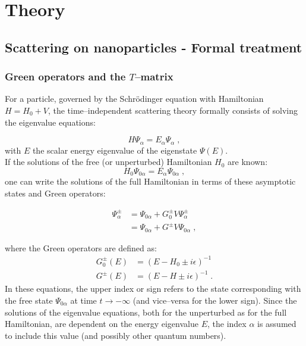 

\chapter{Theory} \label{appendixtheory}

\section{Scattering on nanoparticles - Formal treatment} \label{sec:formal}

\subsection{Green operators and the $T$--matrix}

For a particle, governed by the Schr\"odinger equation with Hamiltonian $H = H_0 + V$, the time--independent scattering theory formally consists of solving the eigenvalue equations:

\begin{equation*}
  H\Psi_\alpha = E_\alpha\Psi_\alpha \; ,
\end{equation*}
with $E$ the scalar energy eigenvalue of the eigenstate $\Psi(E)$.\\
If the solutions of the free (or unperturbed) Hamiltonian $H_0$ are known:
\begin{equation*}
  H_0\Psi_{0\alpha} = E_\alpha\Psi_{0\alpha} \; ,
\end{equation*}
one can write the solutions of the full Hamiltonian in terms of these asymptotic states and Green operators:

\begin{align*}
  \Psi^\pm_\alpha &= \Psi_{0\alpha} + G^\pm_0 V \Psi^\pm_\alpha  \\
  & = \Psi_{0\alpha} + G^\pm V  \Psi_{0\alpha} \; ,
\end{align*}

where the Green operators are defined as:
\begin{align*}
  G^\pm_0(E) &= (E-H_0\pm i\epsilon )^{-1}  \\
  G^\pm (E) &= (E-H\pm i\epsilon )^{-1} \; .
\end{align*}
In these equations, the upper index or sign refers to the state corresponding with the free state $\Psi_{0\alpha}$ at time $t\rightarrow - \infty$ (and vice--versa for the lower sign). Since the solutions of the eigenvalue equations, both for the unperturbed as for the full Hamiltonian, are dependent on the energy eigenvalue $E$, the index $\alpha$ is assumed to include this value (and possibly other quantum numbers).


